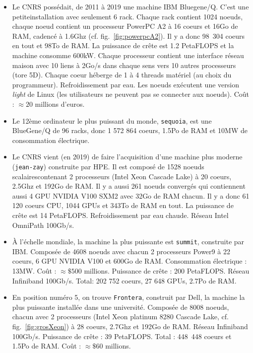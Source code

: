 \begin{itemize}
\item Le CNRS possédait, de 2011 à 2019 une machine IBM Bluegene/Q. C'est une
  \og petite\fg installation avec seulement 6 rack. Chaque rack contient 1024
  noeuds, chaque noeud contient un processeur PowerPC A2 à 16 coeurs et 16Go de
  RAM, cadencé à 1.6Ghz (cf. fig.~\ref{fig:powerpcA2}). Il y a donc 98~304 coeurs
  en tout et 98To de RAM. La puissance de crête est 1.2 PetaFLOPS et la machine
  consomme 600kW. Chaque processeur contient une interface réseau \og maison\fg
  avec 10 liens à 2Go/s dans chaque sens vers 10 autres processeurs (tore
  5D). Chaque coeur héberge de 1 à 4 threads matériel (au choix du
  programmeur). Refroidissement par eau. Les noeuds exécutent une version
  \emph{light} de Linux (les utilisateurs ne peuvent pas se connecter aux
  noeuds). Coût : $\approx 20$ millions d'euros.

\medskip
  
\item Le 12ème ordinateur le plus puissant du monde, \texttt{sequoia}, est une
  BlueGene/Q de 96 racks, donc 1 572 864 coeurs, 1.5Po de RAM et 10MW de
  consommation électrique.

  \medskip
  
\item Le CNRS vient (en 2019) de faire l'acquisition d'une machine plus moderne
  (\texttt{jean-zay}) construite par HPE. Il est composé de 1528 noeuds \og
  scalaires\fg contenant 2 processeurs (Intel Xeon \og Cascade Lake) à
  20 coeurs, 2.5Ghz et 192Go de RAM. Il y a aussi 261 noeuds \og convergés\fg
  qui contiennent aussi 4 GPU NVIDIA V100 SXM2 avec 32Go de RAM chacun. Il y a donc
  61 120 coeurs CPU, 1044 GPUs et 343To de RAM en tout. La puissance de crête
  est 14 PetaFLOPS. Refroidissement par eau chaude. Réseau Intel OmniPath
  100Gb/s.

\medskip
  
\item À l'échelle mondiale, la machine la plus puissante est \texttt{summit},
  construite par IBM. Composée de 4608 noeuds avec chacun 2 processeurs Power9 à
  22 coeurs, 6 GPU NVIDIA V100 et 600Go de RAM. Consommation électrique :
  13MW. Coût : $\approx \$500$ millions. Puissance de crête : 200
  PetaFLOPS. Réseau Infiniband 100Gb/s. Total: 202 752 coeurs, 27 648 GPUs,
  2.7Po de RAM.

\medskip
  
\item En position numéro 5, on trouve \texttt{Frontera}, construit par Dell, la
  machine la plus puissante installée dans une université. Composée de 8008
  noeuds, chacun avec 2 processeurs (Intel Xeon platinum 8280 \og Cascade
  Lake\fg, cf. fig.~\ref{fig:grosXeon}) à 28 coeurs, 2.7Ghz et 192Go de
  RAM. Réseau Infiniband 100Gb/s. Puissance de crête : 39 PetaFLOPS. Total :
  448~448 coeurs et 1.5Po de RAM. Coût : $\approx \$60$ millions.


\end{itemize}
